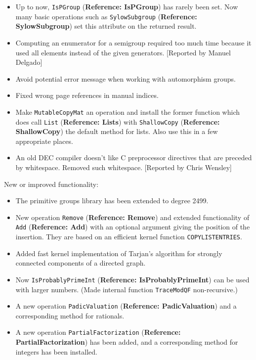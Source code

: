 \documentclass[a4paper,11pt]{report}
\begin{document}
{{\begin{itemize}
 A few formulations in the documentation concerning character tables have been
improved slightly. 
\item  Up to now, \texttt{IsPGroup} (\textbf{Reference: IsPGroup}) has rarely been set. Now many basic operations such as \texttt{SylowSubgroup} (\textbf{Reference: SylowSubgroup}) set this attribute on the returned result. 
\item  Computing an enumerator for a semigroup required too much time because it used
all elements instead of the given generators. [Reported by Manuel Delgado] 
\item  Avoid potential error message when working with automorphism groups. 
\item  Fixed wrong page references in manual indices. 
\item  Make \texttt{MutableCopyMat} an operation and install the former function which does call \texttt{List} (\textbf{Reference: Lists}) with \texttt{ShallowCopy} (\textbf{Reference: ShallowCopy}) the default method for lists. Also use this in a few appropriate places. 
\item  An old DEC compiler doesn't like C preprocessor directives that are preceded
by whitespace. Removed such whitespace. [Reported by Chris Wensley] 
\end{itemize}
 New or improved functionality: 
\begin{itemize}
\item  The primitive groups library has been extended to degree 2499. 
\item  New operation \texttt{Remove} (\textbf{Reference: Remove}) and extended functionality of \texttt{Add} (\textbf{Reference: Add}) with an optional argument giving the position of the insertion. They are based
on an efficient kernel function \texttt{COPY{\textunderscore}LIST{\textunderscore}ENTRIES}. 
\item  Added fast kernel implementation of Tarjan's algorithm for strongly connected
components of a directed graph. 
\item  Now \texttt{IsProbablyPrimeInt} (\textbf{Reference: IsProbablyPrimeInt}) can be used with larger numbers. (Made internal function \texttt{TraceModQF} non-recursive.) 
\item  A new operation \texttt{PadicValuation} (\textbf{Reference: PadicValuation}) and a corresponding method for rationals. 
\item  A new operation \texttt{PartialFactorization} (\textbf{Reference: PartialFactorization}) has been added, and a corresponding method for integers has been installed.

\end{itemize}}}
\end{document}
